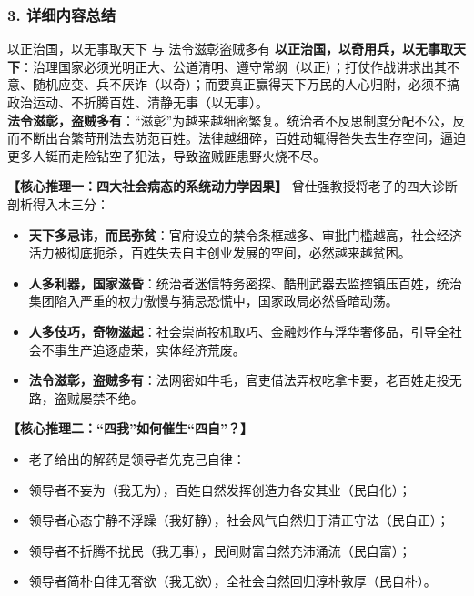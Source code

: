 \subsubsection{3. 详细内容总结}

\begin{ConceptBox}{以正治国，以无事取天下 与 法令滋彰盗贼多有}
\textbf{以正治国，以奇用兵，以无事取天下}：治理国家必须光明正大、公道清明、遵守常纲（以正）；打仗作战讲求出其不意、随机应变、兵不厌诈（以奇）；而要真正赢得天下万民的人心归附，必须不搞政治运动、不折腾百姓、清静无事（以无事）。\\
\textbf{法令滋彰，盗贼多有}：“滋彰”为越来越细密繁复。统治者不反思制度分配不公，反而不断出台繁苛刑法去防范百姓。法律越细碎，百姓动辄得咎失去生存空间，逼迫更多人铤而走险钻空子犯法，导致盗贼匪患野火烧不尽。
\end{ConceptBox}

\noindent\textbf{【核心推理一：四大社会病态的系统动力学因果】}
曾仕强教授将老子的四大诊断剖析得入木三分：
\begin{itemize}
    \item \textbf{天下多忌讳，而民弥贫}：官府设立的禁令条框越多、审批门槛越高，社会经济活力被彻底扼杀，百姓失去自主创业发展的空间，必然越来越贫困。
    \item \textbf{人多利器，国家滋昏}：统治者迷信特务密探、酷刑武器去监控镇压百姓，统治集团陷入严重的权力傲慢与猜忌恐慌中，国家政局必然昏暗动荡。
    \item \textbf{人多伎巧，奇物滋起}：社会崇尚投机取巧、金融炒作与浮华奢侈品，引导全社会不事生产追逐虚荣，实体经济荒废。
    \item \textbf{法令滋彰，盗贼多有}：法网密如牛毛，官吏借法弄权吃拿卡要，老百姓走投无路，盗贼屡禁不绝。
\end{itemize}

\noindent\textbf{【核心推理二：“四我”如何催生“四自”？】}
\begin{itemize}
    \item 老子给出的解药是领导者先克己自律：
    \item 领导者不妄为（我无为），百姓自然发挥创造力各安其业（民自化）；
    \item 领导者心态宁静不浮躁（我好静），社会风气自然归于清正守法（民自正）；
    \item 领导者不折腾不扰民（我无事），民间财富自然充沛涌流（民自富）；
    \item 领导者简朴自律无奢欲（我无欲），全社会自然回归淳朴敦厚（民自朴）。
\end{itemize}

